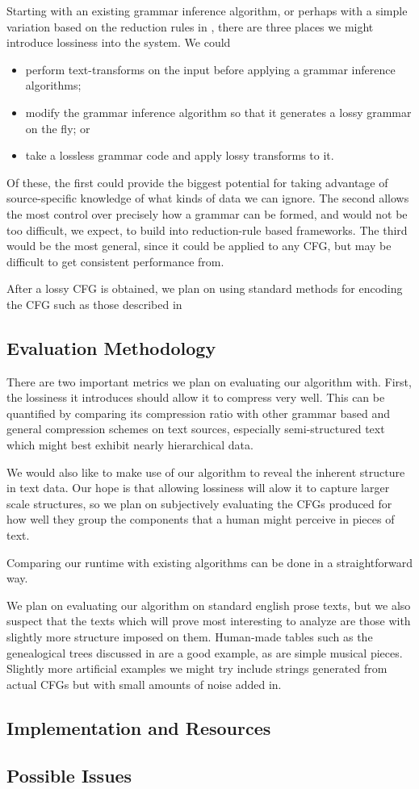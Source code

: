 \documentclass[11pt]{article}
\begin{document}
Starting with an existing grammar inference algorithm, or perhaps with a simple
variation based on the reduction rules in \cite{grammarcodes}, there are three
places we might introduce lossiness into the system.  We could
\begin{itemize}
  \item perform text-transforms on the input before applying a grammar
    inference algorithms;
  \item modify the grammar inference algorithm so that it generates a lossy
    grammar on the fly; or
  \item take a lossless grammar code and apply lossy transforms to it.
\end{itemize}
Of these, the first could provide the biggest potential for taking advantage of
source-specific knowledge of what kinds of data we can ignore.  The second
allows the most control over precisely how a grammar can be formed, and would
not be too difficult, we expect, to build into reduction-rule based frameworks.
The third would be the most general, since it could be applied to any CFG, but
may be difficult to get consistent performance from.

After a lossy CFG is obtained, we plan on using standard methods for encoding
the CFG such as those described in \cite{sequitur2}

\subsection{Evaluation Methodology}

There are two important metrics we plan on evaluating our algorithm with.
First, the lossiness it introduces should allow it to compress very well. This
can be quantified by comparing its compression ratio with other grammar based
and general compression schemes on text sources, especially semi-structured
text which might best exhibit nearly hierarchical data.

We would also like to make use of our algorithm to reveal the inherent
structure in text data. Our hope is that allowing lossiness will alow it to
capture larger scale structures, so we plan on subjectively evaluating the CFGs
produced for how well they group the components that a human might perceive in
pieces of text.

Comparing our runtime with existing algorithms can be done in a straightforward
way.

We plan on evaluating our algorithm on standard english prose texts, but we
also suspect that the texts which will prove most interesting to analyze are
those with slightly more structure imposed on them. Human-made tables such as
the genealogical trees discussed in \cite{nevillphd} are a good example, as are
simple musical pieces. Slightly more artificial examples we might try include
strings generated from actual CFGs but with small amounts of noise added in.

\subsection{Implementation and Resources}

\subsection{Possible Issues}

\nocite{*}


\end{document}
